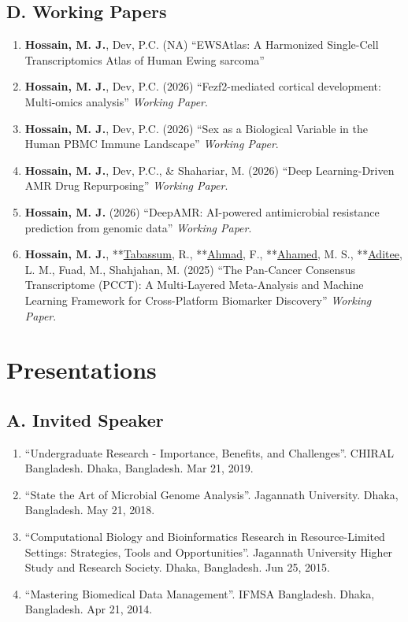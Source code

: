 \documentclass[
  11pt,
  letterpaper,
  DIV=11,
  numbers=noendperiod]{scrartcl}
\providecommand{\tightlist}{%
  \setlength{\itemsep}{0pt}\setlength{\parskip}{0pt}}
\begin{document}
\subsection{D. Working Papers}\label{d.-working-papers}

\begin{enumerate}
\def\labelenumi{\arabic{enumi}.}
\tightlist
\item
  \textbf{Hossain, M. J.}, Dev, P.C. (NA) ``EWSAtlas: A Harmonized
  Single-Cell Transcriptomics Atlas of Human Ewing sarcoma''\\
\item
  \textbf{Hossain, M. J.}, Dev, P.C. (2026) ``Fezf2-mediated cortical
  development: Multi-omics analysis'' \emph{Working Paper}.\\
\item
  \textbf{Hossain, M. J.}, Dev, P.C. (2026) ``Sex as a Biological
  Variable in the Human PBMC Immune Landscape'' \emph{Working Paper}.\\
\item
  \textbf{Hossain, M. J.}, Dev, P.C., \& Shahariar, M. (2026) ``Deep
  Learning-Driven AMR Drug Repurposing'' \emph{Working Paper}.\\
\item
  \textbf{Hossain, M. J.} (2026) ``DeepAMR: AI-powered antimicrobial
  resistance prediction from genomic data'' \emph{Working Paper}.\\
\item
  \textbf{Hossain, M. J.}, **\underline{Tabassum}, R.,
  **\underline{Ahmad}, F., **\underline{Ahamed}, M. S.,
  **\underline{Aditee}, L. M., Fuad, M., Shahjahan, M. (2025) ``The
  Pan-Cancer Consensus Transcriptome (PCCT): A Multi-Layered
  Meta-Analysis and Machine Learning Framework for Cross-Platform
  Biomarker Discovery'' \emph{Working Paper}.
\end{enumerate}

\section{Presentations}\label{presentations}

\subsection{A. Invited Speaker}\label{a.-invited-speaker}

\begin{enumerate}
\def\labelenumi{\arabic{enumi}.}
\tightlist
\item
  ``Undergraduate Research - Importance, Benefits, and Challenges''.
  CHIRAL Bangladesh. Dhaka, Bangladesh. Mar 21, 2019.
\item
  ``State the Art of Microbial Genome Analysis''. Jagannath University.
  Dhaka, Bangladesh. May 21, 2018.
\item
  ``Computational Biology and Bioinformatics Research in
  Resource-Limited Settings: Strategies, Tools and Opportunities''.
  Jagannath University Higher Study and Research Society. Dhaka,
  Bangladesh. Jun 25, 2015.
\item
  ``Mastering Biomedical Data Management''. IFMSA Bangladesh. Dhaka,
  Bangladesh. Apr 21, 2014.
\end{enumerate}
\end{document}
